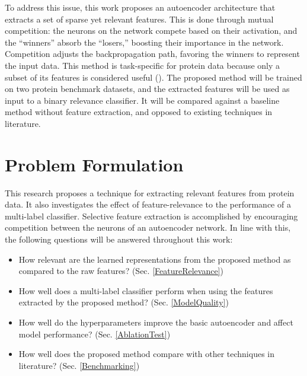 \par To address this issue, this work proposes an autoencoder architecture that
extracts a set of sparse yet relevant features. This is done through mutual
competition: the neurons on the network compete based on their activation, and
the ``winners'' absorb the ``losers,'' boosting their importance in the network.
Competition adjusts the backpropagation path, favoring the winners to represent
the input data. This method is task-specific for protein data because only a subset
of its features is considered useful (\cite{iqbal2014efficient, gaudet2017gene}).
The proposed method will be trained on two protein benchmark datasets, and the
extracted features will be used as input to a binary relevance classifier. It will
be compared against a baseline method without feature extraction, and opposed to
existing techniques in literature.

\section{Problem Formulation}
\label{Problem}

\par This research proposes a technique for extracting relevant features from
protein data. It also investigates the effect of feature-relevance to the
performance of a multi-label classifier. Selective feature extraction is
accomplished by encouraging competition between the neurons of an
autoencoder network. In line with this, the following questions will be
answered throughout this work:

\begin{itemize}
    \item How relevant are the learned representations from the proposed method
        as compared to the raw features? (Sec. \ref{FeatureRelevance})
    \item How well does a multi-label classifier perform when using the
        features extracted by the proposed method? (Sec. \ref{ModelQuality})
    \item How well do the hyperparameters improve the basic autoencoder and
        affect model performance? (Sec. \ref{AblationTest})
    \item How well does the proposed method compare with other techniques in
        literature? (Sec. \ref{Benchmarking})
\end{itemize}


